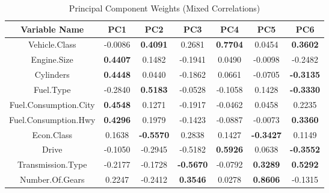 \documentclass[11pt]{article}
\begin{document}
\begin{table}[ht!]
\centering
\small
\begin{tabular}{c | c c c c c c } 
\hline
Variable Name               &  PC1 &  PC2 &  PC3 &  PC4 &   PC5 &  PC6\\
\hline
Vehicle.Class        & -0.0086 &  \textbf{0.4091} &  0.2681 &  \textbf{0.7704} &  0.0454 &  \textbf{0.3602}\\
Engine.Size          & \textbf{0.4407} &  0.1482 & -0.1941 &  0.0490 & -0.0098 & -0.2482\\
Cylinders            & \textbf{0.4448} &  0.0440 & -0.1862 &  0.0661 & -0.0705 & \textbf{-0.3135}\\
Fuel.Type            & -0.2840 &  \textbf{0.5183} & -0.0528 & -0.1058 &  0.1428 & \textbf{-0.3330}\\
Fuel.Consumption.City& \textbf{0.4548} &  0.1271 & -0.1917 & -0.0462 &  0.0458 &  0.2235\\
Fuel.Consumption.Hwy & \textbf{0.4296} &  0.1979 & -0.1423 & -0.0887 & -0.0073 &  \textbf{0.3360}\\
Econ.Class           & 0.1638 & \textbf{-0.5570} &  0.2838 &  0.1427 & \textbf{-0.3427} &  0.1149\\
Drive                & -0.1050 & -0.2945 & -0.5182 &  \textbf{0.5926} &  0.0638 & \textbf{-0.3552}\\
Transmission.Type    & -0.2177 & -0.1728 & \textbf{-0.5670} & -0.0792 &  \textbf{0.3289} &  \textbf{0.5292}\\
Number.Of.Gears      & 0.2247 & -0.2412 &  \textbf{0.3546} &  0.0278 &  \textbf{0.8606} & -0.1315\\
\hline  
\end{tabular}
\caption{Principal Component Weights (Mixed Correlations)}
\end{table}
\end{document}
